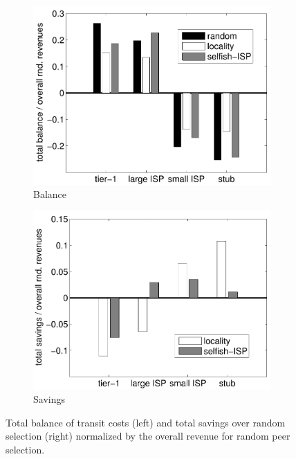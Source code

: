 \begin{figure}[bt]
	\centering
	\begin{subfigure}[b]{0.49\textwidth}
	  \includegraphics[width=\textwidth]{aslevel/p2p/results/figs/total_balance}
    \caption{Balance}
    \label{fig:total_balance}
  \end{subfigure}
	\begin{subfigure}[b]{0.49\textwidth}
	 	\includegraphics[width=\textwidth]{aslevel/p2p/results/figs/savings}
    \caption{Savings}
    \label{fig:savings}
	\end{subfigure}
	\caption{Total balance of transit costs (left) and total savings over random selection (right) normalized by the overall revenue for random peer selection.}
\end{figure}

